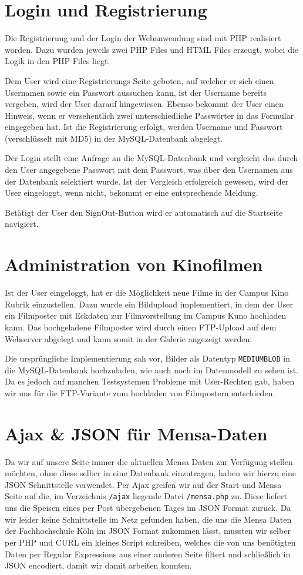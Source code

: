 \chapter{Login und Registrierung}
Die Registrierung und der Login der Webanwendung sind mit PHP realisiert worden. Dazu wurden jeweils zwei PHP Files und HTML Files erzeugt, wobei die Logik in den PHP Files liegt.

Dem User wird eine Registrierungs-Seite geboten, auf welcher er sich einen Usernamen sowie ein Passwort aussuchen kann, ist der Username bereits vergeben, wird der User darauf hingewiesen. Ebenso bekommt der User einen Hinweis, wenn er versehentlich zwei unterschiedliche Passwörter in das Formular eingegeben hat. Ist die Registrierung erfolgt, werden Username und Passwort (verschlüsselt mit MD5) in der MySQL-Datenbank abgelegt.

Der Login stellt eine Anfrage an die MySQL-Datenbank und vergleicht das durch den User angegebene Passwort mit dem Passwort, was über den Usernamen aus der Datenbank selektiert wurde. Ist der Vergleich erfolgreich gewesen, wird der User eingeloggt, wenn nicht, bekommt er eine entsprechende Meldung.

Betätigt der User den SignOut-Button wird er automatisch auf die Startseite navigiert.

\chapter{Administration von Kinofilmen}
Ist der User eingeloggt, hat er die Möglichkeit neue Filme in der Campus Kino Rubrik einzustellen. Dazu wurde ein Bildupload implementiert, in dem der User ein Filmposter mit Eckdaten zur Filmvorstellung im Campus Kuno hochladen kann. Das hochgeladene Filmposter wird durch einen FTP-Upload auf dem Webserver abgelegt und kann somit in der Galerie angezeigt werden.

Die ursprüngliche Implementierung sah vor, Bilder als Datentyp \texttt{MEDIUMBLOB} in die MySQL-Datenbank hochzuladen, wie auch noch im Datenmodell zu sehen ist. Da es jedoch auf manchen Testsystemen Probleme mit User-Rechten gab, haben wir uns für die FTP-Variante zum hochladen von Filmpostern entschieden.

\chapter{Ajax \& JSON für Mensa-Daten}
Da wir auf unsere Seite immer die aktuellen Mensa Daten zur Verfügung stellen möchten, ohne diese selber in eine Datenbank einzutragen, haben wir hierzu eine JSON Schnittstelle verwendet. Per Ajax greifen wir auf der Start-und Mensa Seite auf die, im Verzeichnis \texttt{/ajax} liegende Datei \texttt{/mensa.php} zu. Diese liefert uns die Speisen eines per Post übergebenen Tages im JSON Format zurück.
Da wir leider keine Schnittstelle im Netz gefunden haben, die uns die Mensa Daten der Fachhochschule Köln im JSON Format zukommen lässt, mussten wir selber per PHP und CURL ein kleines Script schreiben, welches die von uns benötigten Daten per Regular Expressions aus einer anderen Seite filtert und schließlich in JSON encodiert, damit wir damit arbeiten konnten.